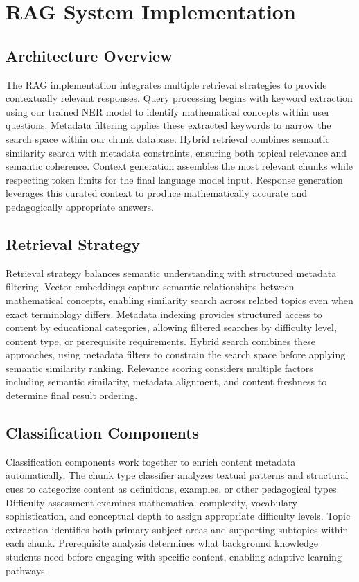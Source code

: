 \documentclass[12pt]{article}
\begin{document}
\section{RAG System Implementation}

\subsection{Architecture Overview}

The RAG implementation integrates multiple retrieval strategies to provide contextually relevant responses. Query processing begins with keyword extraction using our trained NER model to identify mathematical concepts within user questions. Metadata filtering applies these extracted keywords to narrow the search space within our chunk database. Hybrid retrieval combines semantic similarity search with metadata constraints, ensuring both topical relevance and semantic coherence. Context generation assembles the most relevant chunks while respecting token limits for the final language model input. Response generation leverages this curated context to produce mathematically accurate and pedagogically appropriate answers.

\subsection{Retrieval Strategy}

Retrieval strategy balances semantic understanding with structured metadata filtering. Vector embeddings capture semantic relationships between mathematical concepts, enabling similarity search across related topics even when exact terminology differs. Metadata indexing provides structured access to content by educational categories, allowing filtered searches by difficulty level, content type, or prerequisite requirements. Hybrid search combines these approaches, using metadata filters to constrain the search space before applying semantic similarity ranking. Relevance scoring considers multiple factors including semantic similarity, metadata alignment, and content freshness to determine final result ordering.

\subsection{Classification Components}

Classification components work together to enrich content metadata automatically. The chunk type classifier analyzes textual patterns and structural cues to categorize content as definitions, examples, or other pedagogical types. Difficulty assessment examines mathematical complexity, vocabulary sophistication, and conceptual depth to assign appropriate difficulty levels. Topic extraction identifies both primary subject areas and supporting subtopics within each chunk. Prerequisite analysis determines what background knowledge students need before engaging with specific content, enabling adaptive learning pathways.
\end{document}
